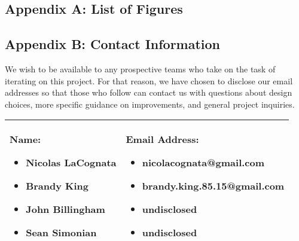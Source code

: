 \subsection{Appendix A: List of Figures}
{
\setlength{\parskip}{0em}
\listoffigures
}

\newpage
\subsection{Appendix B: Contact Information}
We wish to be available to any prospective teams who take on the task of iterating on this project. For that reason, we have chosen to disclose our email addresses so that those who follow can contact us with questions about design choices, more specific guidance on improvements, and general project inquiries. \\

\begin{center}
    \begin{tabular}{| m{5cm} | m{9cm} |} 
        \hline
            \textbf{Name:} 
            \begin{itemize}
                \setlength\itemsep{-.35em}
                \item Nicolas LaCognata
                \item Brandy King
                \item John Billingham
                \item Sean Simonian
            \end{itemize}& 
            \textbf{Email Address:} 
            \begin{itemize}
                \setlength\itemsep{-.35em}
                \item nicolacognata@gmail.com
                \item brandy.king.85.15@gmail.com
                \item undisclosed
                \item undisclosed
            \end{itemize}
            \\
        \hline
    \end{tabular}
\end{center}